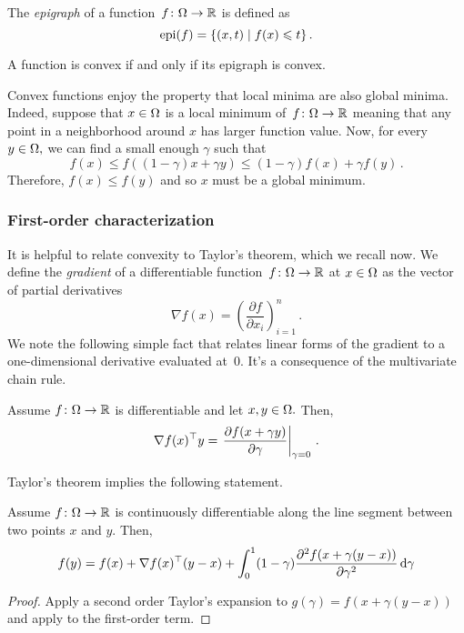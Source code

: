 \begin{definition}
The \emph{epigraph} of a function~$f\colon \Omega\to\mathbb{R}$ is defined as 
\[
\mathrm{epi}(f) = \{(x, t)\mid f(x)\leqslant t\}\,.
\]
\end{definition}

\begin{fact}
A function is convex if and only if its epigraph is convex.
\end{fact}

Convex functions enjoy the property that local minima are also global minima. Indeed, suppose that $x\in\Omega$ is a local minimum of~$f\colon\Omega\to\mathbb{R}$ meaning that any point in a neighborhood around $x$ has larger function value. Now, for every $y\in\Omega,$ we can find a small enough $\gamma$ such that
\[
f(x) \le f((1-\gamma)x+\gamma y) \le (1-\gamma)f(x)+\gamma f(y)\,.
\]
Therefore, $f(x)\le f(y)$ and so $x$ must be a global minimum.

\subsubsection{First-order characterization}

It is helpful to relate convexity to Taylor's theorem, which we recall now. We define the \emph{gradient} of a differentiable function~$f\colon\Omega\to\mathbb{R}$ at $x\in\Omega$ as the vector of partial derivatives
\[
\nabla f(x) = \left( \frac{\partial f}{\partial x_i} \right)_{i=1}^n\,.
\]
We note the following simple fact that relates linear forms of the gradient to a
one-dimensional derivative evaluated at~$0.$ It's a consequence of the multivariate chain rule.
\begin{fact}
Assume $f\colon\Omega\to\mathbb{R}$ is differentiable and let $x,y\in\Omega.$ Then,
\[
\nabla f(x)^\top y
= \left.\frac{\partial f(x+\gamma y)}{\partial \gamma}\right|_{\gamma=0}\,.
\]
\end{fact}
Taylor's theorem implies the following statement.
\begin{proposition}
Assume $f\colon\Omega\to\mathbb{R}$ is continuously differentiable along the line segment between two points $x$ and $y.$ Then,
\[
f(y) = f(x) 
+ \nabla f(x)^\top (y-x)
+ \int_0^1 (1-\gamma)\frac{\partial^2 f(x+\gamma(y-x))}{\partial\gamma^2}\,\mathrm{d}\gamma
\]
\end{proposition}
\begin{proof}
Apply a second order Taylor's expansion to $g(\gamma)=f(x+\gamma(y-x))$ and apply  to the first-order term. 
\end{proof}

